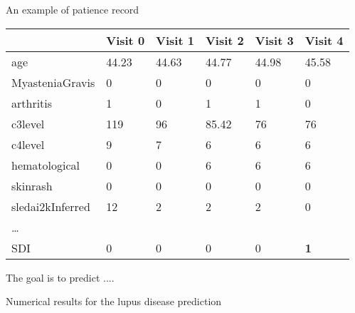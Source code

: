 
\begin{frame}{An example of patience record}
\begin{table}[H]
	\centering
	\begin{tabular}{ C{2.5cm} | C{1cm} C{1cm} C{1cm} C{1cm} C{1cm}}
		& Visit 0 & Visit 1 & Visit 2 & Visit 3 & Visit 4 \\
		\hline
		age & 44.23 & 44.63 & 44.77 & 44.98 & 45.58 \\
		MyasteniaGravis & 0 & 0 & 0 & 0 & 0 \\
		arthritis & 1 & 0 & 1 & 1 & 0 \\
		c3level & 119 & 96 & 85.42 & 76 & 76 \\
		c4level & 9 & 7 & 6 & 6 & 6 \\
		hematological & 0 & 0 & 6 & 6 & 6 \\
		skinrash & 0 & 0 & 0 & 0 & 0 \\
		sledai2kInferred & 12 & 2 & 2 & 2 & 0 \\
		\dots & & & & & \\
		\hline
		SDI & 0 & 0 & 0 & 0 & \textbf{1}\\
	\end{tabular}
\end{table}	
\end{frame}

\begin{frame}
	The goal is to predict ....
\end{frame}


\begin{frame}{Numerical results for the lupus disease prediction}

\begin{figure}
	\centering
\end{figure}

\end{frame}


 
